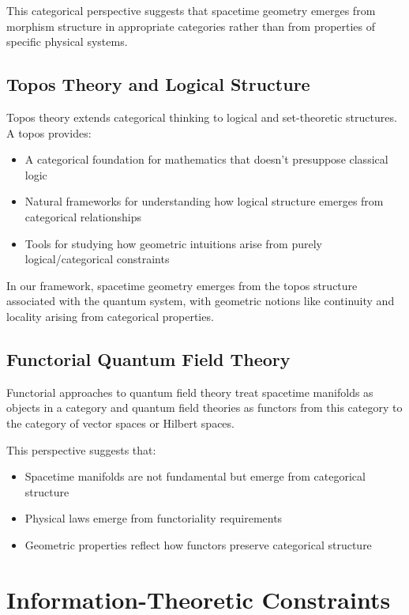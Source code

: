 \documentclass[12pt]{article}
\begin{document}
This categorical perspective suggests that spacetime geometry emerges from morphism structure in appropriate categories rather than from properties of specific physical systems.

\subsection{Topos Theory and Logical Structure}

Topos theory extends categorical thinking to logical and set-theoretic structures. A topos provides:

\begin{itemize}
\item A categorical foundation for mathematics that doesn't presuppose classical logic
\item Natural frameworks for understanding how logical structure emerges from categorical relationships
\item Tools for studying how geometric intuitions arise from purely logical/categorical constraints
\end{itemize}

In our framework, spacetime geometry emerges from the topos structure associated with the quantum system, with geometric notions like continuity and locality arising from categorical properties.

\subsection{Functorial Quantum Field Theory}

Functorial approaches to quantum field theory treat spacetime manifolds as objects in a category and quantum field theories as functors from this category to the category of vector spaces or Hilbert spaces.

This perspective suggests that:
\begin{itemize}
\item Spacetime manifolds are not fundamental but emerge from categorical structure
\item Physical laws emerge from functoriality requirements
\item Geometric properties reflect how functors preserve categorical structure
\end{itemize}

\section{Information-Theoretic Constraints}
\end{document}
